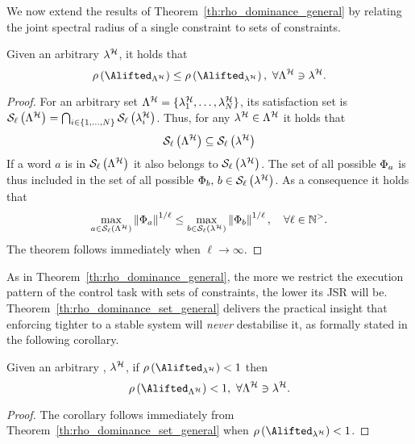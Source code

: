 We now extend the results of Theorem~\ref{th:rho_dominance_general} by relating the joint spectral radius of a single constraint to sets of constraints.
\begin{theorem}%
    \label{th:rho_dominance_set_general}%
    Given an arbitrary \ewhc{} $\lambda^{\mathcal{H}}$, it holds that
    \begin{equation*}
        \rho\left(\Alifted_{\Lambda^\strat}\right) \leq \rho \left( \Alifted_{\lambda^\strat} \right) ,\,\, \forall \Lambda^\strat \ni \lambda^\strat.
    \end{equation*}
    \begin{proof}
        For an arbitrary \ewhc{} set $\Lambda^{\mathcal{H}} = \{\lambda^{\mathcal{H}}_1, \dots, \lambda^{\mathcal{H}}_N\}$, its satisfaction set is $\mathcal{S}_{\ell}\left( \Lambda^{\mathcal{H}} \right) = \bigcap_{i \in \{1,\dots, N\}} \mathcal{S}_{\ell}\left( \lambda^{\mathcal{H}}_i \right)$.
        Thus, for any $\lambda^{\mathcal{H}} \in \Lambda^{\mathcal{H}}$ it holds that 
        \begin{equation*}
            \mathcal{S}_{\ell}\left( \Lambda^{\mathcal{H}} \right) \subseteq \mathcal{S}_{\ell}\left( \lambda^{\mathcal{H}} \right)
        \end{equation*}
        If a word $a$ is in $\mathcal{S}_{\ell}\left( \Lambda^{\mathcal{H}} \right)$ it also belongs to $\mathcal{S}_{\ell}\left( \lambda^{\mathcal{H}} \right)$. 
        The set of all possible $\Phi{}_{a}$ is thus included in the set of all possible $\Phi{}_{b},\, b \in \mathcal{S}_{\ell}\left( \lambda^{\mathcal{H}} \right)$.
        As a consequence it holds that
        \begin{equation*}
            \max_{a \in \mathcal{S}_{\ell}\left( \Lambda^{\mathcal{H}}  \right)} \left\lVert\Phi{}_{a}\right\rVert^{1/\ell} \leq
            \max_{b \in \mathcal{S}_{\ell}\left( \lambda^{\mathcal{H}}  \right)} \left\lVert\Phi{}_{b}\right\rVert^{1/\ell}, \quad
            \forall \ell\in\mathbb{N}^{>}.
        \end{equation*}
        The theorem follows immediately when $\ell\rightarrow \infty$.
    \end{proof}
\end{theorem}

As in Theorem~\ref{th:rho_dominance_general}, the more we restrict the execution pattern of the control task with sets of constraints, the lower its JSR will be.
Theorem~\ref{th:rho_dominance_set_general} delivers the practical insight that enforcing tighter \ewhc{} to a stable system will \emph{never} destabilise it, as formally stated in the following corollary.
\begin{corollary}%
    \label{cor:rho_dominance_set}%
    Given an arbitrary \ewhc{}, $\lambda^{\mathcal{H}}$, if $\rho \left( \Alifted_{\lambda^\strat} \right) < 1$ then
    \begin{equation*}
        \rho\left(\Alifted_{\Lambda^\strat}\right) < 1 ,\,\, \forall \Lambda^\strat \ni \lambda^\strat.
    \end{equation*}

    \begin{proof}
        The corollary follows immediately from Theorem~\ref{th:rho_dominance_set_general} when $\rho \left( \Alifted_{\lambda^\strat} \right) < 1$.
    \end{proof}
\end{corollary}
